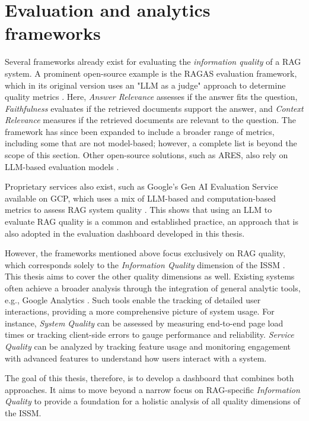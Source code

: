 \documentclass[
	english,
	ruledheaders=section,%
	class=report,%
	thesis={type=bachelor},%
	accentcolor=1b,%
	custommargins=true,%
	marginpar=false,%
	parskip=half-,%
	fontsize=11pt,%
	DIV=14,
]{tudapub}
\begin{document}
\section{Evaluation and analytics frameworks}
Several frameworks already exist for evaluating the \textit{information quality} of a RAG system. A prominent open-source example is the RAGAS evaluation framework, which in its original version uses an "LLM as a judge" approach to determine quality metrics \parencite[pp.~123--124]{Es_James_Espinosa_Anke_Schockaert_2024}. Here, \textit{Answer Relevance} assesses if the answer fits the question, \textit{Faithfulness} evaluates if the retrieved documents support the answer, and \textit{Context Relevance} measures if the retrieved documents are relevant to the question. The framework has since been expanded to include a broader range of metrics, including some that are not model-based; however, a complete list is beyond the scope of this section. Other open-source solutions, such as ARES, also rely on LLM-based evaluation models \parencite[p.~216]{Saad_Falcon_Khattab_Potts_Zaharia_2024}.

Proprietary services also exist, such as Google's Gen AI Evaluation Service available on GCP, which uses a mix of LLM-based and computation-based metrics to assess RAG system quality \parencite{GoogleGenAIEvaluation}. This shows that using an LLM to evaluate RAG quality is a common and established practice, an approach that is also adopted in the evaluation dashboard developed in this thesis.

However, the frameworks mentioned above focus exclusively on RAG quality, which corresponds solely to the \textit{Information Quality} dimension of the ISSM \parencite{DeloneMcLean2003ISSuccessTenYearUpdate}. This thesis aims to cover the other quality dimensions as well. Existing systems often achieve a broader analysis through the integration of general analytic tools, e.g., Google Analytics \parencite{GoogleAnalytics}. Such tools enable the tracking of detailed user interactions, providing a more comprehensive picture of system usage. For instance, \textit{System Quality} \parencite[p.~64]{DeloneMcLean1992ISSuccess} can be assessed by measuring end-to-end page load times or tracking client-side errors to gauge performance and reliability. \textit{Service Quality} \parencite[p.~18]{DeloneMcLean2003ISSuccessTenYearUpdate} can be analyzed by tracking feature usage and monitoring engagement with advanced features to understand how users interact with a system.

The goal of this thesis, therefore, is to develop a dashboard that combines both approaches. It aims to move beyond a narrow focus on RAG-specific \textit{Information Quality} \parencite[pp.~64--66]{DeloneMcLean1992ISSuccess} to provide a foundation for a holistic analysis of all quality dimensions of the ISSM.
\end{document}
